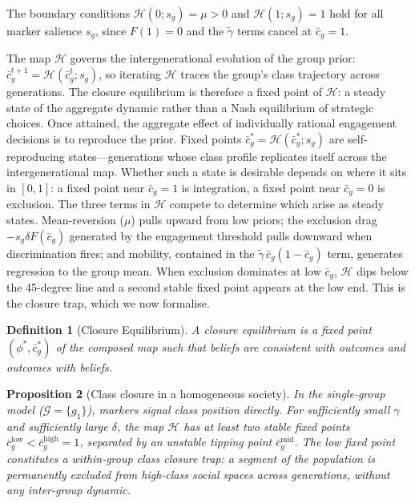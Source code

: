 \documentclass[12pt,a4paper]{article}
\newtheorem{proposition}{Proposition}
\newtheorem{definition}[proposition]{Definition}
\theoremstyle{definition}
\numberwithin{proposition}{subsection}
\newcommand{\G}{\mathcal{G}}
\begin{document}
The boundary conditions $\mathcal{H}(0; s_g) = \mu > 0$ and
$\mathcal{H}(1; s_g) = 1$ hold for all marker salience $s_g$, since $F(1) = 0$ and the
$\tilde{\gamma}$ terms cancel at $\bar{c}_g = 1$.

The map $\mathcal{H}$ governs the intergenerational evolution of the group
prior: $\bar{c}_g^{t+1} = \mathcal{H}(\bar{c}_g^t; s_g)$, so iterating $\mathcal{H}$
traces the group's class trajectory across generations. The closure
equilibrium is therefore a fixed point of $\mathcal{H}$: a steady state of
the aggregate dynamic rather than a Nash equilibrium of strategic
choices. Once attained, the aggregate effect of individually
rational engagement decisions is to reproduce the prior. Fixed
points $\bar{c}_g^* = \mathcal{H}(\bar{c}_g^*; s_g)$ are self-reproducing
states---generations whose class profile replicates itself across
the intergenerational map. Whether such a state is desirable
depends on where it sits in $[0,1]$: a fixed point near
$\bar{c}_g = 1$ is integration, a fixed point near $\bar{c}_g = 0$
is exclusion. The three terms in $\mathcal{H}$ compete to determine which
arise as steady states. Mean-reversion ($\mu$) pulls upward from
low priors; the exclusion drag $-s_g \delta F(\bar{c}_g)$
generated by the engagement threshold pulls downward when
discrimination fires; and mobility, contained in the
$\tilde{\gamma}\,\bar{c}_g(1 - \bar{c}_g)$ term, generates
regression to the group mean. When exclusion dominates at low
$\bar{c}_g$, $\mathcal{H}$ dips below the 45-degree line and a second stable
fixed point appears at the low end. This is the closure trap,
which we now formalise.

\begin{definition}[Closure Equilibrium]
\label{def:closure}
A closure equilibrium is a fixed point $(\phi^*, \bar{c}_g^*)$ of the
composed map such that beliefs are consistent with outcomes and
outcomes with beliefs.
\end{definition}

\begin{proposition}[Class closure in a homogeneous society]
\label{prop:class-closure}
In the single-group model ($\G = \{g_1\}$), markers signal class
position directly. For sufficiently small $\gamma$ and sufficiently
large $\delta$, the map $\mathcal{H}$ has at least two stable fixed points
$\bar{c}_g^{\mathrm{low}} < \bar{c}_g^{\mathrm{high}} = 1$, separated by an unstable tipping point
$\bar{c}_g^{\mathrm{mid}}$. The low fixed point constitutes a
within-group class closure trap: a segment of the population is
permanently excluded from high-class social spaces across
generations, without any inter-group dynamic.
\end{proposition}
\end{document}

